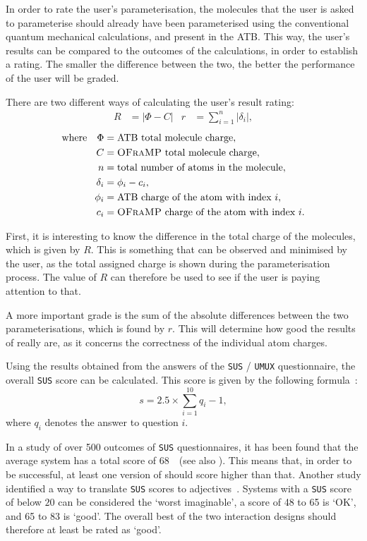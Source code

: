 In order to rate the user's parameterisation, the molecules that the user is asked to parameterise should already have been parameterised using the conventional quantum mechanical calculations, and present in the ATB. This way, the user's results can be compared to the outcomes of the calculations, in order to establish a rating. The smaller the difference between the two, the better the performance of the user will be graded.

There are two different ways of calculating the user's result rating:
\begin{align*}
R &= |\Phi - C| & r &= \sum_{i = 1}^{n} |\delta_{i}|,
\end{align*}
\vspace{-1em}
\begin{align*}
\text{where} \quad \Phi &= \text{ATB total molecule charge},\\
C &= \text{\textsc{OFraMP}{} total molecule charge},\\
n &= \text{total number of atoms in the molecule},\\
\delta_{i} &= \phi_{i} - c_{i},\\
\phi_{i} &= \text{ATB charge of the atom with index}~i,\\
c_{i} &= \text{\textsc{OFraMP}{} charge of the atom with index}~i.
\end{align*}

First, it is interesting to know the difference in the total charge of the molecules, which is given by $R$. This is something that can be observed and minimised by the user, as the total assigned charge is shown during the parameterisation process. The value of $R$ can therefore be used to see if the user is paying attention to that.

A more important grade is the sum of the absolute differences between the two parameterisations, which is found by $r$. This will determine how good the results of \oframp{} really are, as it concerns the correctness of the individual atom charges.

Using the results obtained from the answers of the \verb|SUS| / \verb|UMUX| questionnaire, the overall \verb|SUS| score can be calculated. This score is given by the following formula~\cite{sauro2011measuring}:
\[
s = 2.5 \times \sum_{i = 1}^{10} q_{i} - 1,
\]
where $q_{i}$ denotes the answer to question $i$.

In a study of over 500 outcomes of \verb|SUS| questionnaires, it has been found that the average system has a total score of $68$~\cite{sauro2011measuring}~(see also ). This means that, in order to be successful, at least one version of \oframp{} should score higher than that. Another study identified a way to translate \verb|SUS| scores to adjectives~\cite{bangor2009determining}. Systems with a \verb|SUS| score of below $20$ can be considered the `worst imaginable', a score of 48 to 65 is `OK', and 65 to 83 is `good'. The overall best of the two interaction designs should therefore at least be rated as `good'.
